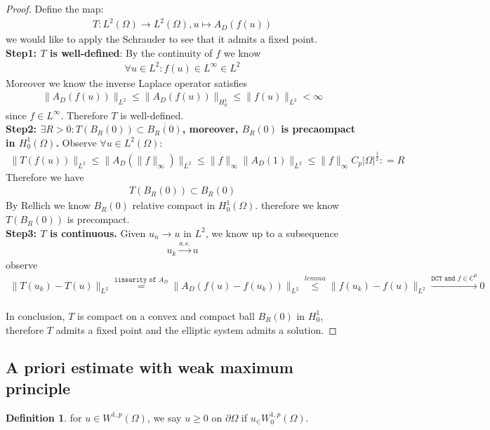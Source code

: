 \documentclass[a4paper,11pt,oneside,fleqn]{book}
\theoremstyle{definition}
\newtheorem{definition}{Definition}[section]
\theoremstyle{remark}
\begin{document}
\begin{proof}
Define the map:
\begin{align*}
	T: L^2(\Omega) \rightarrow L^2(\Omega), u \mapsto A_D(f(u))
\end{align*}
we would like to apply the Schrauder to see that it admits a fixed point. 
	\quad\\
	\textbf{Step1:  $T$ is well-defined}: By the continuity of $f$ we know
	\begin{align*}
		\forall u \in L^2: f(u) \in L^\infty \in L^2
	\end{align*}
	Moreover we know the inverse Laplace operator satisfies
	\begin{align*}
		 \|A_D(f(u))\|_{L^2} \le \|A_D(f(u))\|_{H^1_0} \le \|f(u)\|_{L^2} < \infty
	\end{align*}
	since $f \in L^\infty$. Therefore $T$ is well-defined.\\
	\textbf{Step2: $\exists R > 0: T(B_R(0)) \subset \overline{B_R(0)}$, moreover, $B_R(0)$ is precaompact in $H^1_0(\Omega)$. } Observe $\forall u \in L^2(\Omega):$
	\begin{align*}
		\|T(f(u))\|_{L^2} \le \|A_D(\|f\|_\infty)\|_{L^2} 
		\le \|f\|_\infty \|A_D(1)\|_{L^2} \le \|f\|_\infty C_p |\Omega|^{\frac{1}{2}}: = R
	\end{align*}
	Therefore we have 
	\begin{align*}
		T(B_R(0)) \subset B_R(0)
	\end{align*}
	By Rellich we know $B_R(0)$ relative compact in $H^1_0(\Omega)$. 
	therefore we know $T(B_R(0))$ is precompact.
	\\
	\textbf{Step3: $T$ is continuous.} Given $u_n \rightarrow u$ in $L^2$, we know up to a subsequence 
	\begin{align*}
		u_k  \overset{a.s.}{\rightarrow} u
	\end{align*}
	observe
	\begin{align*}
		\|T(u_k) - T(u)\|_{L^2} 
		\overset{\texttt{linearity of $A_D$}}{=} \|A_D(f(u) - f(u_k))\|_{L^2} 
		\overset{lemma}{\le} \|f(u_k) - f(u)\|_{L^2} 
		\overset{\texttt{DCT and $f \in C^0$}}{\rightarrow} 0
	\end{align*}
	\\
	In conclusion, $T$ is compact on a convex and compact ball $B_R(0)$ in $H^1_0$, therefore $T$ admits a fixed point and the elliptic system admits a solution.
\end{proof}


\subsection{A priori estimate with weak maximum principle}
\begin{definition}
	for $u \in W^{1, p}(\Omega)$, we say $u \ge 0$ on $\partial\Omega$ if $u_ \in W^{1, p}_0(\Omega)$.
\end{definition}
\end{document}
